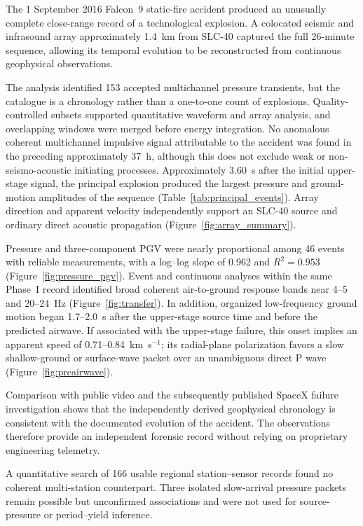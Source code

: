 \documentclass[]{seismica}
\begin{document}
The 1 September 2016 Falcon~9 static-fire accident produced an unusually
complete close-range record of a technological explosion. A colocated seismic
and infrasound array approximately 1.4~km from SLC-40 captured the full
26-minute sequence, allowing its temporal evolution to be reconstructed from
continuous geophysical observations.

The analysis identified 153 accepted multichannel pressure transients, but the
catalogue is a chronology rather than a one-to-one count of explosions.
Quality-controlled subsets supported quantitative waveform and array analysis,
and overlapping windows were merged before energy integration. No anomalous
coherent multichannel impulsive signal attributable to the accident was found
in the preceding approximately 37~h, although this does not exclude weak or
non-seismo-acoustic initiating processes. Approximately 3.60~s after the
initial upper-stage signal, the principal explosion produced the largest
pressure and ground-motion amplitudes of the sequence
(Table~\ref{tab:principal_events}). Array direction and apparent velocity
independently support an SLC-40 source and ordinary direct acoustic propagation
(Figure~\ref{fig:array_summary}).

Pressure and three-component PGV were nearly proportional among 46 events with
reliable measurements, with a log--log slope of 0.962 and $R^2=0.953$
(Figure~\ref{fig:pressure_pgv}). Event and continuous analyses within the same
Phase~I record identified broad coherent air-to-ground response bands near
4--5 and 20--24~Hz (Figure~\ref{fig:transfer}). In addition, organized
low-frequency ground motion began 1.7--2.0~s after the upper-stage source time
and before the predicted airwave. If associated with the upper-stage failure,
this onset implies an apparent speed of 0.71--0.84~km~s$^{-1}$; its
radial-plane polarization favors a slow shallow-ground or surface-wave packet
over an unambiguous direct P wave (Figure~\ref{fig:preairwave}).

Comparison with public video and the subsequently published SpaceX failure investigation shows that the independently derived geophysical chronology is consistent with the documented evolution of the accident. The observations therefore provide an independent forensic record without relying on proprietary engineering telemetry.

A quantitative search of 166 usable regional station--sensor records found no
coherent multi-station counterpart. Three isolated slow-arrival pressure
packets remain possible but unconfirmed associations and were not used for
source-pressure or period--yield inference.
\end{document}
